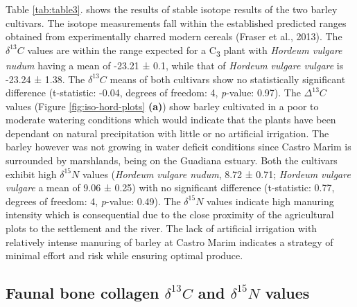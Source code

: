 \documentclass[5p]{elsarticle} %
\begin{document}
Table \ref{tab:table3}. shows the results of stable isotope results of the two barley cultivars. The isotope measurements fall within the established predicted ranges obtained from experimentally charred modern cereals (Fraser et al., 2013). The \(\delta ^{13}C\) values are within the range expected for a C\textsubscript{3} plant with \emph{Hordeum vulgare nudum} having a mean of -23.21 ± 0.1\permil, while that of \emph{Hordeum vulgare vulgare} is -23.24 ± 1.38\permil. The \(\delta ^{13}C\) means of both cultivars show no statistically significant difference (t-statistic: -0.04, degrees of freedom: 4, \emph{p}-value: 0.97). The \(\Delta ^{13}C\) values (Figure \ref{fig:iso-hord-plots} \textbf{(a)}) show barley cultivated in a poor to moderate watering conditions which would indicate that the plants have been dependant on natural precipitation with little or no artificial irrigation. The barley however was not growing in water deficit conditions since Castro Marim is surrounded by marshlands, being on the Guadiana estuary. Both the cultivars exhibit high \(\delta ^{15}N\) values (\emph{Hordeum vulgare nudum}, 8.72 ± 0.71\permil; \emph{Hordeum vulgare vulgare} a mean of 9.06 ± 0.25\permil) with no significant difference (t-statistic: 0.77, degrees of freedom: 4, \emph{p}-value: 0.49). The \(\delta ^{15}N\) values indicate high manuring intensity which is consequential due to the close proximity of the agricultural plots to the settlement and the river. The lack of artificial irrigation with relatively intense manuring of barley at Castro Marim indicates a strategy of minimal effort and risk while ensuring optimal produce.

\hypertarget{faunal-bone-collagen-delta-13c-and-delta-15n-values}{%
\subsection{\texorpdfstring{Faunal bone collagen \(\delta ^{13}C\) and \(\delta ^{15}N\) values}{Faunal bone collagen \textbackslash delta \^{}\{13\}C and \textbackslash delta \^{}\{15\}N values}}\label{faunal-bone-collagen-delta-13c-and-delta-15n-values}}
\end{document}

